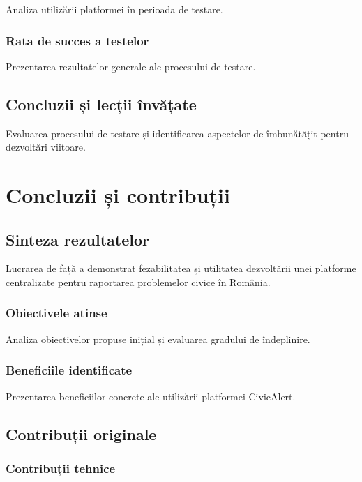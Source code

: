 \documentclass[12pt,a4paper]{report}
\begin{document}
Analiza utilizării platformei în perioada de testare.

\subsection{Rata de succes a testelor}

Prezentarea rezultatelor generale ale procesului de testare.

\section{Concluzii și lecții învățate}

Evaluarea procesului de testare și identificarea aspectelor de îmbunătățit pentru dezvoltări viitoare.

\newpage
\chapter{Concluzii și contribuții}

\section{Sinteza rezultatelor}

Lucrarea de față a demonstrat fezabilitatea și utilitatea dezvoltării unei platforme centralizate pentru raportarea problemelor civice în România.

\subsection{Obiectivele atinse}

Analiza obiectivelor propuse inițial și evaluarea gradului de îndeplinire.

\subsection{Beneficiile identificate}

Prezentarea beneficiilor concrete ale utilizării platformei CivicAlert.

\section{Contribuții originale}

\subsection{Contribuții tehnice}
\end{document}
